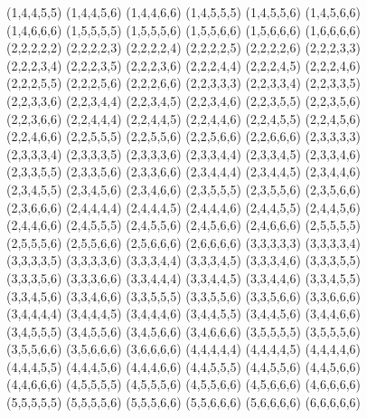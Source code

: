 \begin{tabbing}
(1,4,4,5,5) \> (1,4,4,5,6) \> (1,4,4,6,6) \> (1,4,5,5,5) \> (1,4,5,5,6) \> (1,4,5,6,6) \\ 
(1,4,6,6,6) \> (1,5,5,5,5) \> (1,5,5,5,6) \> (1,5,5,6,6) \> (1,5,6,6,6) \> (1,6,6,6,6) \\ 
(2,2,2,2,2) \> (2,2,2,2,3) \> (2,2,2,2,4) \> (2,2,2,2,5) \> (2,2,2,2,6) \> (2,2,2,3,3) \\ 
(2,2,2,3,4) \> (2,2,2,3,5) \> (2,2,2,3,6) \> (2,2,2,4,4) \> (2,2,2,4,5) \> (2,2,2,4,6) \\ 
(2,2,2,5,5) \> (2,2,2,5,6) \> (2,2,2,6,6) \> (2,2,3,3,3) \> (2,2,3,3,4) \> (2,2,3,3,5) \\ 
(2,2,3,3,6) \> (2,2,3,4,4) \> (2,2,3,4,5) \> (2,2,3,4,6) \> (2,2,3,5,5) \> (2,2,3,5,6) \\ 
(2,2,3,6,6) \> (2,2,4,4,4) \> (2,2,4,4,5) \> (2,2,4,4,6) \> (2,2,4,5,5) \> (2,2,4,5,6) \\ 
(2,2,4,6,6) \> (2,2,5,5,5) \> (2,2,5,5,6) \> (2,2,5,6,6) \> (2,2,6,6,6) \> (2,3,3,3,3) \\ 
(2,3,3,3,4) \> (2,3,3,3,5) \> (2,3,3,3,6) \> (2,3,3,4,4) \> (2,3,3,4,5) \> (2,3,3,4,6) \\ 
(2,3,3,5,5) \> (2,3,3,5,6) \> (2,3,3,6,6) \> (2,3,4,4,4) \> (2,3,4,4,5) \> (2,3,4,4,6) \\ 
(2,3,4,5,5) \> (2,3,4,5,6) \> (2,3,4,6,6) \> (2,3,5,5,5) \> (2,3,5,5,6) \> (2,3,5,6,6) \\ 
(2,3,6,6,6) \> (2,4,4,4,4) \> (2,4,4,4,5) \> (2,4,4,4,6) \> (2,4,4,5,5) \> (2,4,4,5,6) \\ 
(2,4,4,6,6) \> (2,4,5,5,5) \> (2,4,5,5,6) \> (2,4,5,6,6) \> (2,4,6,6,6) \> (2,5,5,5,5) \\ 
(2,5,5,5,6) \> (2,5,5,6,6) \> (2,5,6,6,6) \> (2,6,6,6,6) \> (3,3,3,3,3) \> (3,3,3,3,4) \\ 
(3,3,3,3,5) \> (3,3,3,3,6) \> (3,3,3,4,4) \> (3,3,3,4,5) \> (3,3,3,4,6) \> (3,3,3,5,5) \\ 
(3,3,3,5,6) \> (3,3,3,6,6) \> (3,3,4,4,4) \> (3,3,4,4,5) \> (3,3,4,4,6) \> (3,3,4,5,5) \\ 
(3,3,4,5,6) \> (3,3,4,6,6) \> (3,3,5,5,5) \> (3,3,5,5,6) \> (3,3,5,6,6) \> (3,3,6,6,6) \\ 
(3,4,4,4,4) \> (3,4,4,4,5) \> (3,4,4,4,6) \> (3,4,4,5,5) \> (3,4,4,5,6) \> (3,4,4,6,6) \\ 
(3,4,5,5,5) \> (3,4,5,5,6) \> (3,4,5,6,6) \> (3,4,6,6,6) \> (3,5,5,5,5) \> (3,5,5,5,6) \\ 
(3,5,5,6,6) \> (3,5,6,6,6) \> (3,6,6,6,6) \> (4,4,4,4,4) \> (4,4,4,4,5) \> (4,4,4,4,6) \\ 
(4,4,4,5,5) \> (4,4,4,5,6) \> (4,4,4,6,6) \> (4,4,5,5,5) \> (4,4,5,5,6) \> (4,4,5,6,6) \\ 
(4,4,6,6,6) \> (4,5,5,5,5) \> (4,5,5,5,6) \> (4,5,5,6,6) \> (4,5,6,6,6) \> (4,6,6,6,6) \\ 
(5,5,5,5,5) \> (5,5,5,5,6) \> (5,5,5,6,6) \> (5,5,6,6,6) \> (5,6,6,6,6) \> (6,6,6,6,6) \\ 
\end{tabbing}

